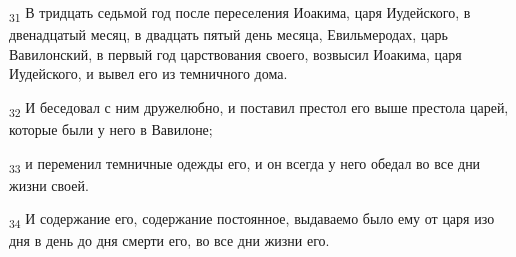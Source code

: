 \begin{tcolorbox}
\textsubscript{31} В тридцать седьмой год после переселения Иоакима, царя Иудейского, в двенадцатый месяц, в двадцать пятый день месяца, Евильмеродах, царь Вавилонский, в первый год царствования своего, возвысил Иоакима, царя Иудейского, и вывел его из темничного дома.
\end{tcolorbox}
\begin{tcolorbox}
\textsubscript{32} И беседовал с ним дружелюбно, и поставил престол его выше престола царей, которые были у него в Вавилоне;
\end{tcolorbox}
\begin{tcolorbox}
\textsubscript{33} и переменил темничные одежды его, и он всегда у него обедал во все дни жизни своей.
\end{tcolorbox}
\begin{tcolorbox}
\textsubscript{34} И содержание его, содержание постоянное, выдаваемо было ему от царя изо дня в день до дня смерти его, во все дни жизни его.
\end{tcolorbox}
